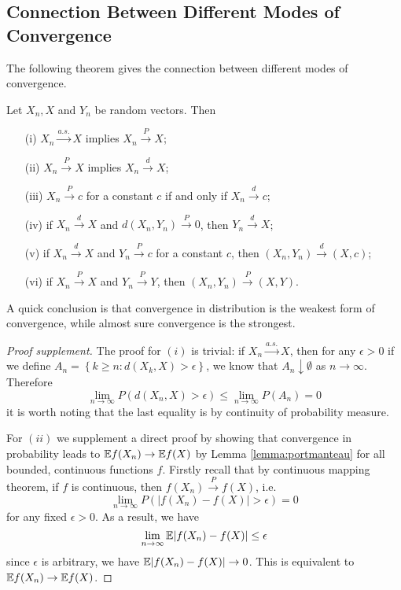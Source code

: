 \documentclass{article}
\begin{document}
\subsection{Connection Between Different Modes of Convergence}
The following theorem gives the connection between different modes of convergence.
\begin{theorem}
    Let $X_n, X$ and $Y_n$ be random vectors. Then
\begin{itemize}
    \item[(i)] $X_n \xrightarrow{a.s.} X$ implies $X_n \xrightarrow{P} X$;
    \item[(ii)] $X_n \xrightarrow{P} X$ implies $X_n \xrightarrow{d} X$;
    \item[(iii)] $X_n \xrightarrow{P} c$ for a constant $c$ if and only if $X_n \xrightarrow{d} c$;
    \item[(iv)] if $X_n \xrightarrow{d} X$ and $d(X_n, Y_n) \xrightarrow{P} 0$, then $Y_n \xrightarrow{d} X$;
    \item[(v)] if $X_n \xrightarrow{d} X$ and $Y_n \xrightarrow{P} c$ for a constant $c$, then $(X_n, Y_n) \xrightarrow{d} (X, c)$;
    \item[(vi)] if $X_n \xrightarrow{P} X$ and $Y_n \xrightarrow{P} Y$, then $(X_n, Y_n) \xrightarrow{P} (X, Y)$.
\end{itemize}
\end{theorem}
A quick conclusion is that convergence in distribution is the weakest form of convergence, while almost sure convergence is the strongest.
\begin{proof}[Proof supplement]\label{thm:connection}
    The proof for $(i)$ is trivial: if $X_n \xrightarrow{a.s.} X$, then for any $\epsilon > 0$ if we define $A_n = \left\{ k \geq n : d(X_k, X) > \epsilon \right\}$, we know that $A_n \downarrow \emptyset$ as $n \to \infty$. Therefore 
    \begin{equation}
        \lim_{n\to\infty} P(d(X_n, X) > \epsilon) \leq \lim_{n\to\infty} P(A_n) = 0
    \end{equation}
    it is worth noting that the last equality is by continuity of probability measure.

    For $(ii)$ we supplement a direct proof by showing that convergence in probability leads to $\mathbb{E} f(X_n) \to \mathbb{E} f(X)$ by Lemma \ref{lemma:portmanteau} for all bounded, continuous functions $f$. Firstly recall that by continuous mapping theorem, if $f$ is continuous, then $f(X_n) \xrightarrow{P} f(X)$, i.e.
    \begin{equation}
        \lim_{n\to\infty} P(|f(X_n) - f(X)| > \epsilon) = 0
    \end{equation}
    for any fixed $\epsilon > 0$. As a result, we have
    \begin{equation}
        \lim_{n\to\infty} \mathbb{E} |f(X_n) - f(X)| \leq \epsilon
    \end{equation}
    since $\epsilon$ is arbitrary, we have $\mathbb{E} |f(X_n) - f(X)| \to 0$. This is equivalent to $\mathbb{E} f(X_n) \to \mathbb{E} f(X)$.
\end{proof}
\end{document}

